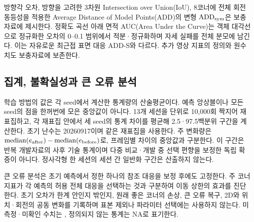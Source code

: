 방향각 오차, 방향을 고려한 3차원 Intersection over Union(IoU), 8코너에 전체 회전 동등성을 적용한 Average Distance of Model Points(ADD)의 변형 $\mathrm{ADD}_{\rm sym}$은 보충자료에 제시한다. 정확도 곡선 아래 면적 AUC(Area Under the Curve)는 객체 대각선으로 정규화한 오차의 0--0.1 범위에서 적분·정규화하며 자세 실패를 전체 분모에 남긴다. 이는 자유로운 최근접 표면 대응 ADD-S와 다르다. 추가 영상 지표의 정의와 원수치도 보충자료에 보존한다.

\subsection{집계, 불확실성과 큰 오류 분석}
학습 방법의 값은 각 seed에서 계산한 통계량의 산술평균이다. 예측 앙상블이나 모든 seed의 점을 한꺼번에 모은 중앙값이 아니다. 13개 세션을 단위로 10,000회 짝지어 재표집하고, 각 재표집 안에서 세 seed의 통계 차이를 평균해 2.5·97.5백분위 구간을 계산한다. 초기 난수는 20260917이며 같은 재표집을 사용한다. 주 변화량은 $\operatorname{median}(e_{\rm after})-\operatorname{median}(e_{\rm before})$로, 프레임별 차이의 중앙값과 구분한다. 이 구간은 반복 개발자료의 사후 기술 통계이며 다중 비교·개발 중 선택 편향을 보정한 독립 확증이 아니다. 정사각형 한 세션의 세션 간 일반화 구간은 산출하지 않는다.

큰 오류 분석은 초기 예측에서 정한 하나의 참조 대응을 보정 후에도 고정한다. 주 코너 지표가 각 예측의 허용 전체 대응을 선택하는 것과 구분하여 이동 상한의 효과를 진단한다. 초기 오차가 한계 안인지 밖인지, 원래 좋은 코너의 손상, 큰 오류 복구, 2D와 위치·회전의 공동 변화를 기록하며 표본 제외나 파라미터 선택에는 사용하지 않는다. 미측정·미확인 수치는 \notrun, 정의되지 않는 통계는 NA로 표기한다.
